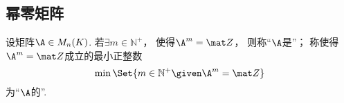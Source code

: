 \subsection{幂零矩阵}
\begin{definition}
设矩阵\(\A \in M_n(K)\).
若\(\exists m\in\mathbb{N}^+\)，
使得\(\A^m = \z\)，
则称“\(\A\)是”；
称使得\(\A^m = \z\)成立的最小正整数\[
    \min\Set{ m\in\mathbb{N}^+ \given \A^m = \z }
\]为“\(\A\)的”.
\end{definition}
